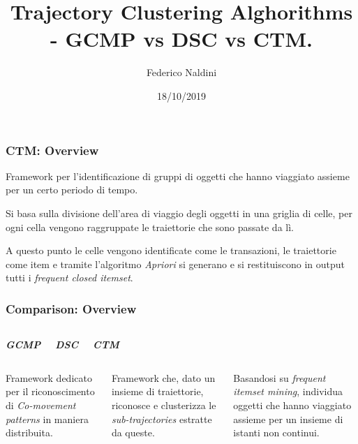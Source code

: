 \documentclass{beamer}
\title[Trajectory Clustering Comparison]{Trajectory Clustering Alghorithms - GCMP vs DSC vs CTM. } %
\author{Federico Naldini} %
\institute[Università di Bologna] %
{
Alma Mater Studiorum - Università di Bologna, Cesena. \\ %
\medskip
\textit{federico.naldini3@studio.unibo.it} %
}
\date{18/10/2019} %
\begin{document}
\begin{frame}
\titlepage %
\end{frame}


\begin{frame}
	\frametitle{CTM: Overview}
	Framework per l'identificazione di gruppi di oggetti che hanno viaggiato assieme per un certo periodo di tempo.
	
	Si basa sulla divisione dell'area di viaggio degli oggetti in una griglia di celle, per ogni cella vengono raggruppate le traiettorie che sono passate da lì.
	
	A questo punto le celle vengono identificate come le transazioni, le traiettorie come item e tramite l'algoritmo \textit{Apriori} si generano e si restituiscono in output tutti i \textit{frequent closed itemset}.
\end{frame}

\begin{frame}
	\frametitle{Comparison: Overview}
	\begin{columns}
		
		\begin{center}
			\textbf{\textit{\huge{GCMP}}}
			
		\end{center}
		
		\begin{center}
			\textbf{\textit{\huge{DSC}}}
			
		\end{center}
		
		\begin{center}
			\textbf{\textit{\huge{CTM}}}
			
		\end{center}
	\end{columns}
	\begin{columns}
		
		\column{.3\columnwidth}
		
	Framework dedicato per il riconoscimento di \textit{Co-movement patterns} in maniera distribuita.
		
		
		\column{.3\textwidth}
	
			Framework che, dato un insieme di traiettorie, riconosce e clusterizza le \textit{sub-trajectories} estratte da queste.
		
		\column{.3\textwidth}
		
		Basandosi su \textit{frequent itemset mining}, individua oggetti  che hanno viaggiato assieme per un insieme di istanti non continui.

	\end{columns}
\end{frame}     
\end{document}
